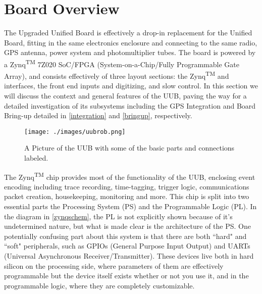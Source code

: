 \section{Board Overview}
\label{boardview}
The Upgraded Unified Board is effectively a drop-in replacement for the Unified Board, fitting in the same electronics enclosure and connecting to the same radio, GPS antenna, power system and photomultiplier tubes. The board is powered by a Zynq\textsuperscript{TM} 7Z020 SoC/FPGA (System-on-a-Chip/Fully Programmable Gate Array), and consists effectively of three layout sections: the Zynq\textsuperscript{TM} and interfaces, the front end inputs and digitizing, and slow control. In this section we will discuss the context and general features of the UUB, paving the way for a detailed investigation of its subsystems including the GPS Integration and Board Bring-up detailed in \autoref{integration} and \autoref{bringup}, respectively.

\begin{figure}[H]
\begin{center}
\texttt{[image: ./images/uubrob.png]}
\caption[UUB Picture]{A Picture of the UUB with some of the basic parts and connections labeled.}
\label{uubpic}
\end{center}
\end{figure}

The Zynq\textsuperscript{TM} chip provides most of the functionality of the UUB, enclosing event encoding including trace recording, time-tagging, trigger logic, communications packet creation, housekeeping, monitoring and more.  This chip is split into two essential parts the Processing System (PS) and the Programmable Logic (PL). In the diagram in \autoref{zynqschem}, the PL is not explicitly shown because of it's undetermined nature, but what is made clear is the architecture of the PS. One potentially confusing part about this system is that there are both ``hard" and ``soft" peripherals, such as GPIOs (General Purpose Input Output) and UARTs (Universal Asynchronous Receiver/Transmitter). These devices live both in hard silicon on the processing side, where parameters of them are effectively programmable but the device itself exists whether or not you use it, and in the programmable logic, where they are completely customizable.

